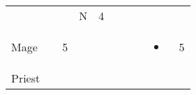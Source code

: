 \documentclass[12pt]{article}
\newcommand{\indexClass}[1]{\index{#1}}
\newcommand{\class}[1]{#1\indexClass{#1}}
\begin{document}
\begin{longtable}[]{@{}llllllllll@{}}
\begin{minipage}[t]{0.06\columnwidth}
\strut\end{minipage} &
\begin{minipage}[t]{0.06\columnwidth}\raggedright\strut
\strut\end{minipage} &
\begin{minipage}[t]{0.06\columnwidth}\raggedright\strut
\strut\end{minipage} &
\begin{minipage}[t]{0.07\columnwidth}\raggedright\strut
N
\strut\end{minipage} &
\begin{minipage}[t]{0.08\columnwidth}\raggedright\strut
4
\strut\end{minipage}\tabularnewline
\begin{minipage}[t]{0.13\columnwidth}\raggedright\strut
\class{Mage}
\strut\end{minipage} &
\begin{minipage}[t]{0.06\columnwidth}\raggedright\strut
\strut\end{minipage} &
\begin{minipage}[t]{0.06\columnwidth}\raggedright\strut
5
\strut\end{minipage} &
\begin{minipage}[t]{0.06\columnwidth}\raggedright\strut
\strut\end{minipage} &
\begin{minipage}[t]{0.06\columnwidth}\raggedright\strut
\strut\end{minipage} &
\begin{minipage}[t]{0.06\columnwidth}\raggedright\strut
\strut\end{minipage} &
\begin{minipage}[t]{0.06\columnwidth}\raggedright\strut
\strut\end{minipage} &
\begin{minipage}[t]{0.06\columnwidth}\raggedright\strut
\strut\end{minipage} &
\begin{minipage}[t]{0.07\columnwidth}\raggedright\strut
\begin{itemize}
\item
\end{itemize}
\strut\end{minipage} &
\begin{minipage}[t]{0.08\columnwidth}\raggedright\strut
5
\strut\end{minipage}\tabularnewline
\begin{minipage}[t]{0.13\columnwidth}\raggedright\strut
\class{Priest}

\end{minipage}
\end{longtable}
\end{document}
